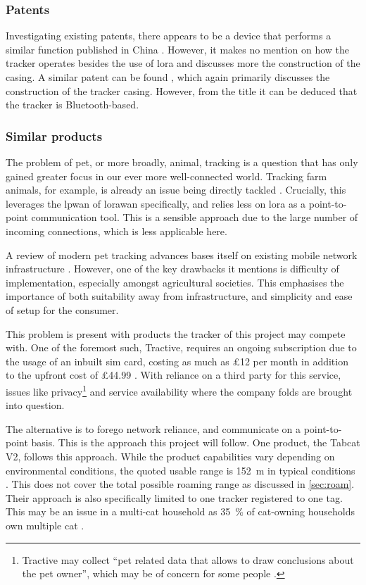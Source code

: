 \subsubsection{Patents}
Investigating existing patents, there appears to be a device 
that performs a similar function published in China \cite{patent:chinatracker}. However,
it makes no mention on how the tracker operates besides the use of \gls{lora} 
and discusses more the construction of the casing. A similar patent can be found 
\cite{patent:bletracker}, which again primarily discusses the construction of the tracker 
casing. However, from the title it can be deduced that the tracker is Bluetooth-based. 

\subsubsection{Similar products}
\label{sec:litsim}
The problem of pet, or more broadly, animal, tracking is a question that has only gained
greater focus in our ever more well-connected world. Tracking farm animals, for example, 
is already an issue being directly tackled \cite{davcev:lorawan}. Crucially, this leverages 
the \acrshort{lpwan} of \gls{lorawan} specifically, and relies less on \gls{lora} as a 
point-to-point communication tool. This is a sensible approach due to the large number of 
incoming connections, which is less applicable here. 

A review of modern pet tracking advances bases itself on existing mobile network 
infrastructure \cite{sivarman:tracker}.
However, one of the key drawbacks it mentions is difficulty of implementation, especially 
amongst agricultural societies. This emphasises the importance of both suitability away 
from infrastructure,
and simplicity and ease of setup for the consumer. 

This problem is present with products the tracker of this project may compete with. 
One of the foremost such, 
Tractive, requires an ongoing subscription due to the usage of an inbuilt \acrshort{sim} card, 
costing as much as £12 per month in addition to the upfront cost of £44.99 \cite{tractive:price, tractive:cat}. 
With reliance on a third party for this service, 
issues like privacy\footnote{
    Tractive may collect ``pet related data that allows to draw conclusions about the pet owner'', which may 
    be of concern for some people \cite{tractive:privacy}.
} and service availability where the company folds are brought into question. 

The alternative is to forego network reliance, and communicate on a point-to-point basis. This is the 
approach this project will follow. One product, the Tabcat V2, follows this approach. 
While the product capabilities vary depending on environmental conditions, the quoted usable range is 
\qty{152}{\m} in typical conditions \cite{tabcat:tracker}. This does not cover the total possible 
roaming range as discussed in \cref{sec:roam}. Their approach is also specifically limited to one 
tracker registered to one tag. This may be an issue in a multi-cat household as \qty{35}{\%} of 
cat-owning households own multiple 
cat \cite{catsprotection:catsreport}. 

